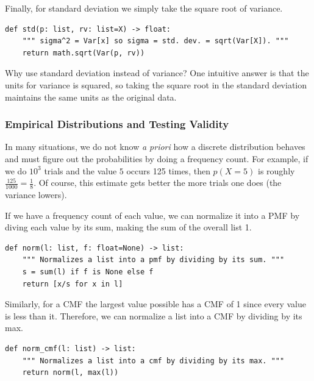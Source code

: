 \documentclass[11pt, oneside]{article}
\theoremstyle{plain}
\theoremstyle{definition}
\begin{document}
Finally, for standard deviation we simply take the square root of variance.
\begin{verbatim}
def std(p: list, rv: list=X) -> float:
    """ sigma^2 = Var[x] so sigma = std. dev. = sqrt(Var[X]). """
    return math.sqrt(Var(p, rv))
\end{verbatim}
Why use standard deviation instead of variance? One intuitive answer is
that the units for variance is squared, so taking the square root in
the standard deviation maintains the same units as the original data.

\subsubsection{Empirical Distributions and Testing Validity}
\label{subsubsec:testing}
In many situations, we do not know \textit{a priori} how a discrete
distribution behaves and must figure out the probabilities by doing
a frequency count. For example, if we do \( 10^3 \) trials and the
value \( 5 \) occurs 125 times, then \( p(X = 5) \) is roughly
\( \frac{125}{1000} = \frac{1}{8} \). Of course, this estimate gets
better the more trials one does (the variance lowers).

If we have a frequency count of each value, we can normalize it into a PMF
by diving each value by its sum, making the sum of the overall list 1.
\begin{verbatim}
def norm(l: list, f: float=None) -> list:
    """ Normalizes a list into a pmf by dividing by its sum. """
    s = sum(l) if f is None else f
    return [x/s for x in l]
\end{verbatim}

Similarly, for a CMF the largest value possible has a CMF
of 1 since every value is less than it. Therefore, we
can normalize a list into a CMF by dividing by its max.
\begin{verbatim}
def norm_cmf(l: list) -> list:
    """ Normalizes a list into a cmf by dividing by its max. """
    return norm(l, max(l))
\end{verbatim}
\end{document}
